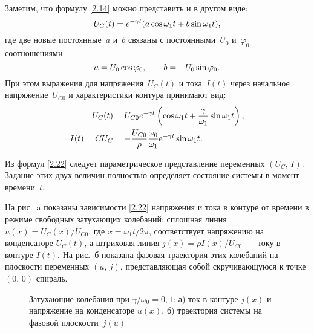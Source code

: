 Заметим, что формулу \eqref{2.14} можно представить и в другом виде:
\begin{equation*}\eqmark{2.20}
U_C(t)=e^{-\gamma t}(a\cos\omega_1 t+ b\sin\omega_1 t),
\end{equation*}
где две новые постоянные~$a$ и~$b$ связаны с постоянными~$U_0$ и~$\varphi_0$
соотношениями
\begin{equation*}\eqmark{2.21}
a=U_0 \cos\varphi_0, \qquad b=-U_0 \sin\varphi_0.
\end{equation*}
При этом выражения для напряжения~$U_C(t)$ и тока~$I(t)$
через начальное напряжение~$U_{C0}$ и характеристики контура принимают вид:
\begin{equation}
	\eqmark{2.22}
		\begin{aligned}
			U_C(t)&=U_{C0}e^{-\gamma t}
                \left(\cos\omega_1 t + \frac{\gamma}{\omega_1}\sin\omega_1 t \right), \\
			I(t)=C\dot{U}_C&
                =-\frac{U_{C0}}{\rho} 
                        \frac{\omega_0}{\omega_1}e^{-\gamma t}\sin\omega_1 t.
		\end{aligned}
\end{equation}

Из формул \eqref{2.22} следует параметрическое представление
 переменных 
$(U_C,\,I)$. Задание этих двух величин полностью определяет состояние
системы в момент времени~$t$.

На рис.~a показаны 
зависимости \eqref{2.22} напряжения и тока в контуре от времени в режиме
свободных затухающих колебаний: сплошная линия 
$u(x)=U_C(x)/U_{C0}$, где $x=\omega_1t/2\pi$, 
соответствует напряжению на конденсаторе $U_C(t)$, а
штриховая линия $j(x)=\rho I(x)/U_{C0}$~--- току в контуре $I(t)$. 
На рис.~б показана фазовая траектория этих колебаний на плоскости
переменных $(u,\,j)$, представляющая собой скручивающуюся 
к точке $(0,\,0)$ спираль.

\begin{figure}[h]
	\begin{minipage}[h]{0.5\linewidth}
		\centering\small
	\end{minipage}
	\hfill
	\begin{minipage}[h]{0.5\linewidth}
		\centering\small
	\end{minipage}
	\caption{Затухающие колебания при $\gamma/\omega_0=0,1$:
а) ток в контуре $j(x)$ и напряжение на конденсаторе $u(x)$,
б) траектория системы на фазовой плоскости~$j(u)$}
\end{figure}

